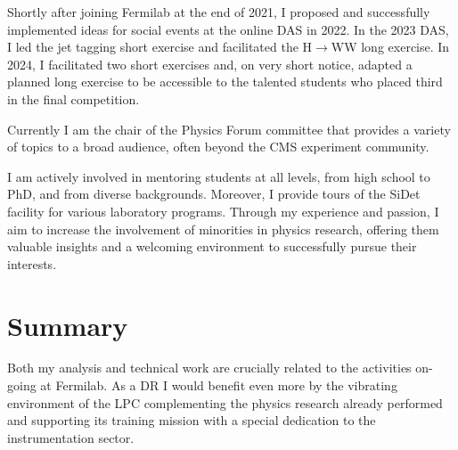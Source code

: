 {\begin{flushleft}
Shortly after joining Fermilab at the end of 2021, I proposed and successfully implemented ideas for social events at the online DAS in 2022.
In the 2023 DAS, I led the jet tagging short exercise and facilitated the H$\to$WW long exercise. In 2024, I facilitated two short exercises and, on very short notice, adapted a planned long exercise to be accessible to the talented students who placed third in the final competition.

Currently I am the chair of the Physics Forum committee that provides a variety of topics to a broad audience, often beyond the CMS experiment community. 

I am actively involved in mentoring students at all levels, from high school to PhD, and from diverse backgrounds. Moreover, I provide tours of the SiDet facility for various laboratory programs. Through my experience and passion, I aim to increase the involvement of minorities in physics research, offering them valuable insights and a welcoming environment to successfully pursue their interests.



\section{Summary} 
\vspace{\baselineskip}
Both my analysis and technical work are crucially related to the activities on-going at Fermilab. As a DR I would benefit even more by the vibrating environment of the LPC  complementing the physics research already performed and supporting its training mission with a special dedication to the instrumentation sector.



\end{flushleft}
}
